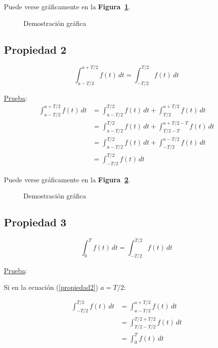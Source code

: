 Puede verse gráficamente en la \textbf{Figura~\ref{figura_02}}.

\begin{figure}[H]
    \centering
    
    \caption{Demostración gráfica}\label{figura_02}
\end{figure}

\subsection*{Propiedad 2}

\begin{equation}
    \int_{a-T/2}^{a+T/2} f(t)\,dt=\int_{-T/2}^{T/2} f(t)\,dt
\label{propiedad2}
\end{equation}

\underline{Prueba}:
\begin{equation*}
\begin{split}
    \int_{a-T/2}^{a+T/2} f(t)\,dt
        &=\int_{a-T/2}^{T/2} f(t)\,dt+\int_{T/2}^{a+T/2} f(t)\,dt\\
        &=\int_{a-T/2}^{T/2} f(t)\,dt+\int_{T/2-T}^{a+T/2-T} f(t)\,dt\\
        &=\int_{a-T/2}^{T/2} f(t)\,dt+\int_{-T/2}^{a-T/2} f(t)\,dt\\
        &=\int_{-T/2}^{T/2} f(t)\,dt
\end{split}
\end{equation*}

Puede verse gráficamente en la \textbf{Figura~\ref{figura_03}}.

\begin{figure}[H]
    \centering
    
    \caption{Demostración gráfica}\label{figura_03}
\end{figure}

\subsection*{Propiedad 3}

\begin{equation}
    \int_{0}^{T} f(t)\,dt=\int_{-T/2}^{T/2} f(t)\,dt
\label{propiedad3}
\end{equation}

\underline{Prueba}:

Si en la ecuación (\ref{propiedad2}) $a=T/2$:

\begin{equation*}
\begin{split}
    \int_{-T/2}^{T/2} f(t)\,dt
        &=\int_{a-T/2}^{a+T/2} f(t)\,dt\\
        &=\int_{T/2-T/2}^{T/2+T/2} f(t)\,dt\\
        &=\int_{0}^{T} f(t)\,dt
\end{split}
\end{equation*}

